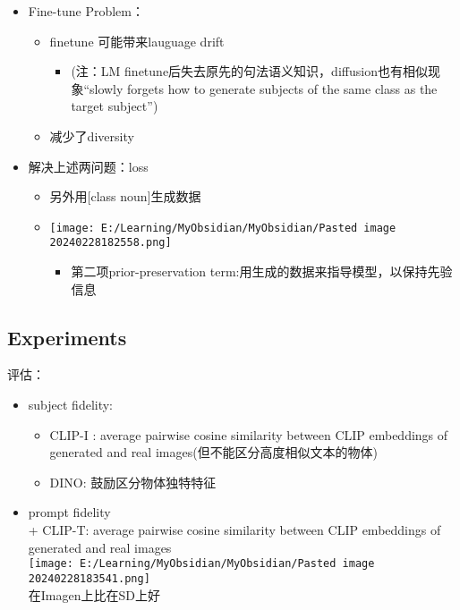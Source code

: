 \documentclass[
]{article}
\providecommand{\tightlist}{%
  \setlength{\itemsep}{0pt}\setlength{\parskip}{0pt}}
\begin{document}
\begin{itemize}
\tightlist
\item
  Fine-tune Problem：

  \begin{itemize}
  \tightlist
  \item
    finetune 可能带来lauguage drift

    \begin{itemize}
    \tightlist
    \item
      (注：LM
      finetune后失去原先的句法语义知识，diffusion也有相似现象``slowly
      forgets how to generate subjects of the same class as the target
      subject'')
    \end{itemize}
  \item
    减少了diversity
  \end{itemize}
\item
  解决上述两问题：loss

  \begin{itemize}
  \tightlist
  \item
    另外用{[}class noun{]}生成数据 {}
  \item
    \texttt{[image: E:/Learning/MyObsidian/MyObsidian/Pasted image 20240228182558.png]}

    \begin{itemize}
    \tightlist
    \item
      第二项prior-preservation
      term:用生成的数据来指导模型，以保持先验信息
    \end{itemize}
  \end{itemize}
\end{itemize}

\subsection{Experiments}\label{experiments}

评估：

\begin{itemize}
\tightlist
\item
  subject fidelity:

  \begin{itemize}
  \tightlist
  \item
    CLIP-I : average pairwise cosine similarity between CLIP embeddings
    of generated and real images(但不能区分高度相似文本的物体)
  \item
    DINO: 鼓励区分物体独特特征
  \end{itemize}
\item
  prompt fidelity\\
  + CLIP-T: average pairwise cosine similarity between CLIP embeddings
  of generated and real images\\
  \texttt{[image: E:/Learning/MyObsidian/MyObsidian/Pasted image 20240228183541.png]}\\
  在Imagen上比在SD上好
\end{itemize}
\end{document}
